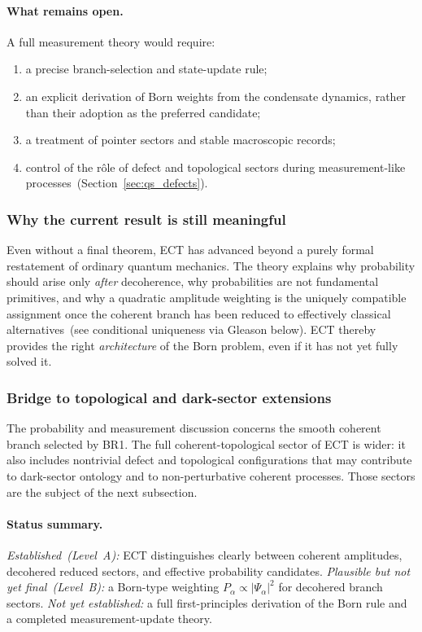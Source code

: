 \documentclass[11pt,a4paper]{article}
\numberwithin{equation}{section}
\begin{document}
\paragraph{What remains open.}
A full measurement theory would require:
\begin{enumerate}[label=(\roman*)]
  \item a precise branch-selection and state-update rule;
  \item an explicit derivation of Born weights from the condensate
    dynamics, rather than their adoption as the preferred candidate;
  \item a treatment of pointer sectors and stable macroscopic records;
  \item control of the r\^ole of defect and topological sectors during
    measurement-like processes~(Section~\ref{sec:qs_defects}).
\end{enumerate}

\subsubsection*{Why the current result is still meaningful}

Even without a final theorem, ECT has advanced beyond a purely formal
restatement of ordinary quantum mechanics.
The theory explains why probability should arise only \emph{after}
decoherence, why probabilities are not fundamental primitives, and why
a quadratic amplitude weighting is the uniquely compatible assignment
once the coherent branch has been reduced to effectively classical
alternatives~(see conditional uniqueness via Gleason below).
ECT thereby provides the right \emph{architecture} of the Born
problem, even if it has not yet fully solved it.

\subsubsection*{Bridge to topological and dark-sector extensions}

The probability and measurement discussion concerns the smooth
coherent branch selected by BR1.
The full coherent-topological sector of ECT is wider: it also includes
nontrivial defect and topological configurations that may contribute
to dark-sector ontology and to non-perturbative coherent processes.
Those sectors are the subject of the next subsection.

\paragraph{Status summary.}
\textit{Established~(Level~A):}
ECT distinguishes clearly between coherent amplitudes, decohered
reduced sectors, and effective probability candidates.
\textit{Plausible but not yet final~(Level~B):}
a Born-type weighting $P_\alpha\propto|\Psi_\alpha|^2$ for decohered
branch sectors.
\textit{Not yet established:}
a full first-principles derivation of the Born rule and a completed
measurement-update theory.
\end{document}
